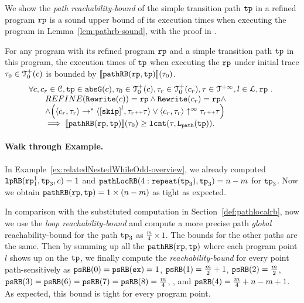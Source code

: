 We show the \emph{path reachability-bound} of the simple transition path $\mathtt{tp}$ in a refined program $\mathtt{rp}$ is a sound upper bound of its execution times when executing the program in Lemma~\ref{lem:pathrb-sound}, with the proof in .
\begin{lem}
  \label{lem:pathrb-sound}
  For any program with its refined program $\mathtt{rp}$ and a simple transition path $\mathtt{tp}$ in this program,
  the execution times of $\mathtt{tp}$ when executing the $\mathtt{rp}$ under initial trace $\mathtt{\tau}_0 \in \mathcal{T}^{+}_0(c)$ is bounded by $\llbracket \mathtt{pathRB}(\mathtt{rp}, \mathtt{tp}) \rrbracket(\mathtt{\tau}_0)$.
  \[
    \begin{array}{l}
    \forall c, c_r \in \cdom, \tpath \in \absG(c), \trace_0 \in \ftdom_0(c),  \trace_r \in \ftdom_0(c_r), \trace \in \tdom, l \in \ldom, \rprog \st 
    \\ \qquad
    REFINE(\algrewrite(c)) = \rprog
    \land 
    \algrewrite(c_r) = \rprog
    \land
    \\ \qquad
    \land 
    \Big(
      \config{c_r, \trace_r} \rightarrow^* \config{\clabel{\eskip}^{l}, \trace_r \tracecat \trace}
      \lor \config{c_r, \trace_r} \uparrow^{\infty} \trace_r \tracecat \trace 
      \Big)
  \\ \qquad
    \implies
    \econfig{\inoutB(\rprog, \tpath)}(\trace_0) \geq \lcounter(\trace, \pathl(\tpath)).
    \end{array}
  \]  
\end{lem}
\paragraph{Walk through Example.}
In Example~\ref{ex:relatedNestedWhileOdd-overview}, we already computed $\mathtt{lpRB}(\mathtt{rp}_1^1, \mathtt{tp}_3, c) = 1$ and
$\mathtt{pathLocRB}(4: \mathtt{repeat}(\mathtt{tp}_3), \mathtt{tp}_3) = n - m$ for $\mathtt{tp}_3$. Now we obtain $\mathtt{pathRB}(\mathtt{rp}, \mathtt{tp}) = 1 \times (n - m)$ as tight as expected.

In comparison with the substituted computation in Section~\ref{def:pathlocalrb}, now we use the \emph{loop reachability-bound}
and compute a more precise path \emph{global} reachability-bound for the path $\mathtt{tp}_3$ as $\frac{m}{4} \times 1$.
The bounds for the other paths are the same.
Then by summing up all the $\mathtt{pathRB}(\mathtt{rp}, \mathtt{tp})$ where each program point $l$ shows up on the $\mathtt{tp}$, we finally compute
the \emph{reachability-bound} for every point path-sensitively as
$\mathtt{psRB}(0) = \mathtt{psRB}(\mathtt{ex}) = 1$,
$\mathtt{psRB}(1) = \frac{m}{2} + 1$,
$\mathtt{psRB}(2) = \frac{m}{2} $, 
$\mathtt{psRB}(3) = \mathtt{psRB}(6) = \mathtt{psRB}(7)  = \mathtt{psRB}(8) = \frac{m}{4} $,
,
and $\mathtt{psRB}(4) =  \frac{m}{4} + n - m + 1$.
As expected, this bound is tight for every program point.